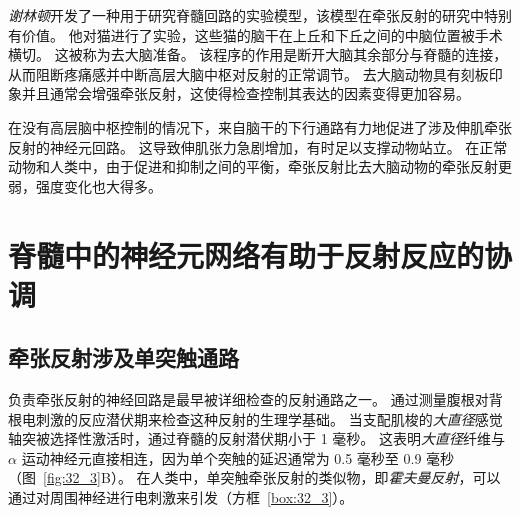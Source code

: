 \textit{谢林顿}开发了一种用于研究脊髓回路的实验模型，该模型在牵张反射的研究中特别有价值。
他对猫进行了实验，这些猫的脑干在上丘和下丘之间的中脑位置被手术横切。
这被称为去大脑准备。
该程序的作用是断开大脑其余部分与脊髓的连接，从而阻断疼痛感并中断高层大脑中枢对反射的正常调节。
去大脑动物具有刻板印象并且通常会增强牵张反射，这使得检查控制其表达的因素变得更加容易。


在没有高层脑中枢控制的情况下，来自脑干的下行通路有力地促进了涉及伸肌牵张反射的神经元回路。
这导致伸肌张力急剧增加，有时足以支撑动物站立。
在正常动物和人类中，由于促进和抑制之间的平衡，牵张反射比去大脑动物的牵张反射更弱，强度变化也大得多。



\section{脊髓中的神经元网络有助于反射反应的协调}

\subsection{牵张反射涉及单突触通路}

负责牵张反射的神经回路是最早被详细检查的反射通路之一。
通过测量腹根对背根电刺激的反应潜伏期来检查这种反射的生理学基础。
当支配肌梭的\textit{大直径}感觉轴突被选择性激活时，通过脊髓的反射潜伏期小于 1 毫秒。
这表明\textit{大直径}纤维与 $ \alpha $ 运动神经元直接相连，因为单个突触的延迟通常为 0.5 毫秒至 0.9 毫秒（图~\ref{fig:32_3}B）。
在人类中，单突触牵张反射的类似物，即\textit{霍夫曼反射}，可以通过对周围神经进行电刺激来引发（方框~\ref{box:32_3}）。


